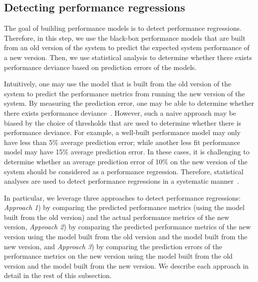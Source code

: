\subsection{Detecting performance regressions} \label{sec:comparions-approaches}

The goal of building performance models is to detect performance regressions. Therefore, in this step, we use the black-box performance models that are built from an old version of the system to predict the expected system performance of a new version. Then, we use statistical analysis to determine whether there exists performance deviance based on prediction errors of the models.

Intuitively, one may use the model that is built from the old version of the system to predict the performance metrics from running the new version of the system. By measuring the prediction error, one may be able to determine whether there exists performance deviance~\citep{DBLP:conf/osdi/CohenCGKS04,DBLP:conf/wosp/NguyenAJHNF12}. However, such a naive approach may be biased by the choice of thresholds that are used to determine whether there is performance deviance. For example, a well-built performance model may only have less than 5\% average prediction error; while another less fit performance model may have 15\% average prediction error. In these cases, it is challenging to determine whether an average prediction error of 10\% on the new version of the system should be considered as a performance regression. Therefore, statistical analyses are used to detect performance regressions in a systematic manner~\citep{DBLP:conf/icst/GaoJBL16,DBLP:conf/wosp/ShangHNF15,Foo:2015:ICS:2819009.2819034}. 

In particular, we leverage three approaches to detect performance regressions: \emph{Approach 1}) by comparing the predicted performance metrics (using the model built from the old version) and the actual performance metrics of the new version, \emph{Approach 2}) by comparing the predicted performance metrics of the new version using the model built from the old version and the model built from the new version, and \emph{Approach 3}) by comparing the prediction errors of the performance metrics on the new version using the model built from the old version and the model built from the new version. We describe each approach in detail in the rest of this subsection.

